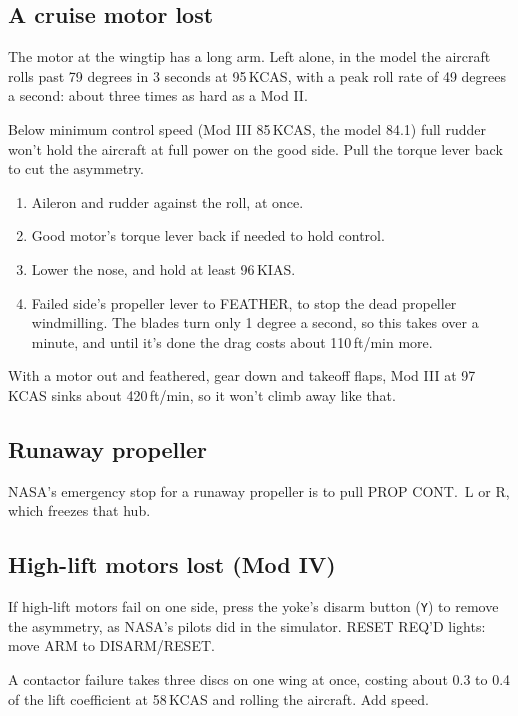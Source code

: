 \documentclass[11pt,a4paper,oneside]{book}
\newcommand{\key}[1]{\texttt{#1}}
\newcommand{\ann}[1]{\textsf{\small #1}}
\begin{document}
\subsection{A cruise motor lost}
The motor at the wingtip has a long arm. Left alone, in the model the aircraft rolls past 79 degrees in 3 seconds at 95\,KCAS, with a peak roll rate of 49 degrees a second: about three times as hard as a Mod II.
\begin{warning}
Below minimum control speed (Mod III 85\,KCAS, the model 84.1) full rudder won't hold the aircraft at full power on the good side. Pull the torque lever back to cut the asymmetry.
\end{warning}
\begin{enumerate}
\item Aileron and rudder against the roll, at once.
\item Good motor's torque lever back if needed to hold control.
\item Lower the nose, and hold at least 96\,KIAS.
\item Failed side's propeller lever to \ann{FEATHER}, to stop the dead propeller windmilling. The blades turn only 1 degree a second, so this takes over a minute, and until it's done the drag costs about 110\,ft/min more.
\end{enumerate}
With a motor out and feathered, gear down and takeoff flaps, Mod III at 97\,KCAS sinks about 420\,ft/min, so it won't climb away like that.

\subsection{Runaway propeller}
NASA's emergency stop for a runaway propeller is to pull \ann{PROP CONT.\ L} or \ann{R}, which freezes that hub.

\subsection{High-lift motors lost (Mod IV)}
If high-lift motors fail on one side, press the yoke's disarm button (\key{Y}) to remove the asymmetry, as NASA's pilots did in the simulator. \ann{RESET REQ'D} lights: move \ann{ARM} to \ann{DISARM/RESET}.
\begin{warning}
A contactor failure takes three discs on one wing at once, costing about 0.3 to 0.4 of the lift coefficient at 58\,KCAS and rolling the aircraft. Add speed.
\end{warning}
\end{document}

